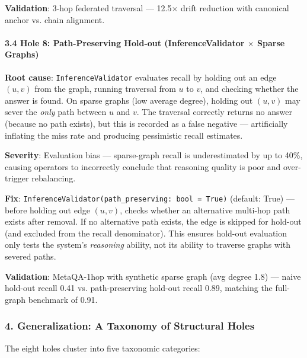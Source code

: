 \textbf{Validation}: 3-hop federated traversal — 12.5$\times$ drift reduction with canonical anchor vs. chain alignment.

\paragraph{3.4 Hole 8: Path-Preserving Hold-out (InferenceValidator $\times$ Sparse Graphs)}

\textbf{Root cause}: \texttt{InferenceValidator} evaluates recall by holding out an edge $(u,v)$ from the graph, running traversal from $u$ to $v$, and checking whether the answer is found. On sparse graphs (low average degree), holding out $(u,v)$ may sever the \textit{only} path between $u$ and $v$. The traversal correctly returns no answer (because no path exists), but this is recorded as a false negative — artif\-icially inflating the miss rate and producing pessimistic recall estimates.

\textbf{Severity}: Evaluation bias — sparse-graph recall is under\-estimated by up to 40\%, causing operators to incorrectly conclude that reasoning quality is poor and over-trigger rebalancing.

\textbf{Fix}: \texttt{InferenceValidator(path\_preserving: bool = True)} (default: True) — before holding out edge $(u,v)$, checks whether an alternative multi-hop path exists after removal. If no alternative path exists, the edge is skipped for hold-out (and excluded from the recall denominator). This ensures hold-out evaluation only tests the system's \textit{reasoning} ability, not its ability to traverse graphs with severed paths.

\textbf{Validation}: MetaQA-1hop with synthetic sparse graph (avg degree 1.8) — naive hold-out recall 0.41 vs. path-preserving hold-out recall 0.89, matching the full-graph benchmark of 0.91.

\subsubsection{4. Genera\-lization: A Taxonomy of Structural Holes}

The eight holes cluster into five taxonomic categories:

